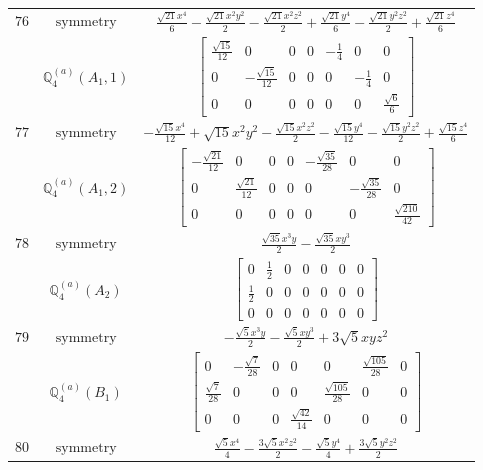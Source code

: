 \documentclass[fleqn,8pt,landscape]{jsarticle}
\begin{document}
\begin{longtable}{ccc}
$ 76 $ & $ \text{symmetry} $ & $ \frac{\sqrt{21} x^{4}}{6} - \frac{\sqrt{21} x^{2} y^{2}}{2} - \frac{\sqrt{21} x^{2} z^{2}}{2} + \frac{\sqrt{21} y^{4}}{6} - \frac{\sqrt{21} y^{2} z^{2}}{2} + \frac{\sqrt{21} z^{4}}{6} $ \\
$  $ & $ \mathbb{Q}_{4}^{(a)}(A_{1},1) $ & $ \begin{bmatrix} \frac{\sqrt{15}}{12} & 0 & 0 & 0 & - \frac{1}{4} & 0 & 0 \\ 0 & - \frac{\sqrt{15}}{12} & 0 & 0 & 0 & - \frac{1}{4} & 0 \\ 0 & 0 & 0 & 0 & 0 & 0 & \frac{\sqrt{6}}{6} \end{bmatrix} $ \\ \hline
$ 77 $ & $ \text{symmetry} $ & $ - \frac{\sqrt{15} x^{4}}{12} + \sqrt{15} x^{2} y^{2} - \frac{\sqrt{15} x^{2} z^{2}}{2} - \frac{\sqrt{15} y^{4}}{12} - \frac{\sqrt{15} y^{2} z^{2}}{2} + \frac{\sqrt{15} z^{4}}{6} $ \\
$  $ & $ \mathbb{Q}_{4}^{(a)}(A_{1},2) $ & $ \begin{bmatrix} - \frac{\sqrt{21}}{12} & 0 & 0 & 0 & - \frac{\sqrt{35}}{28} & 0 & 0 \\ 0 & \frac{\sqrt{21}}{12} & 0 & 0 & 0 & - \frac{\sqrt{35}}{28} & 0 \\ 0 & 0 & 0 & 0 & 0 & 0 & \frac{\sqrt{210}}{42} \end{bmatrix} $ \\ \hline
$ 78 $ & $ \text{symmetry} $ & $ \frac{\sqrt{35} x^{3} y}{2} - \frac{\sqrt{35} x y^{3}}{2} $ \\
$  $ & $ \mathbb{Q}_{4}^{(a)}(A_{2}) $ & $ \begin{bmatrix} 0 & \frac{1}{2} & 0 & 0 & 0 & 0 & 0 \\ \frac{1}{2} & 0 & 0 & 0 & 0 & 0 & 0 \\ 0 & 0 & 0 & 0 & 0 & 0 & 0 \end{bmatrix} $ \\ \hline
$ 79 $ & $ \text{symmetry} $ & $ - \frac{\sqrt{5} x^{3} y}{2} - \frac{\sqrt{5} x y^{3}}{2} + 3 \sqrt{5} x y z^{2} $ \\
$  $ & $ \mathbb{Q}_{4}^{(a)}(B_{1}) $ & $ \begin{bmatrix} 0 & - \frac{\sqrt{7}}{28} & 0 & 0 & 0 & \frac{\sqrt{105}}{28} & 0 \\ \frac{\sqrt{7}}{28} & 0 & 0 & 0 & \frac{\sqrt{105}}{28} & 0 & 0 \\ 0 & 0 & 0 & \frac{\sqrt{42}}{14} & 0 & 0 & 0 \end{bmatrix} $ \\ \hline
$ 80 $ & $ \text{symmetry} $ & $ \frac{\sqrt{5} x^{4}}{4} - \frac{3 \sqrt{5} x^{2} z^{2}}{2} - \frac{\sqrt{5} y^{4}}{4} + \frac{3 \sqrt{5} y^{2} z^{2}}{2} $ \\

\end{longtable}
\end{document}
